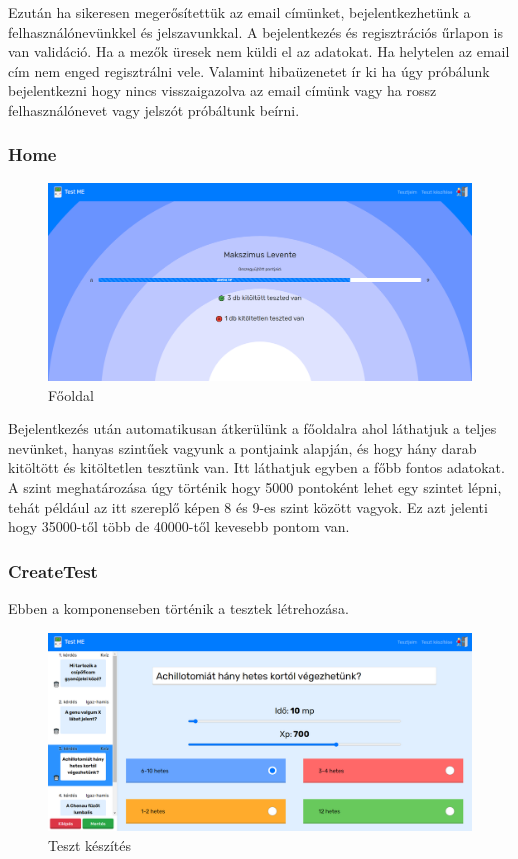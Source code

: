 Ezután ha sikeresen megerősítettük az email címünket, bejelentkezhetünk a felhasználónevünkkel és jelszavunkkal.
A bejelentkezés és regisztrációs űrlapon is van validáció. Ha a mezők üresek nem küldi el az adatokat. Ha helytelen az email cím nem enged regisztrálni vele. Valamint hibaüzenetet ír ki ha úgy próbálunk bejelentkezni hogy nincs visszaigazolva az email címünk vagy ha rossz felhasználónevet vagy jelszót próbáltunk beírni.

\subsubsection{Home}

\begin{figure}[H]
    \centering
    \includegraphics[width=\linewidth]{images/home.png}
    \caption{Főoldal}
\end{figure}

Bejelentkezés után automatikusan átkerülünk a főoldalra ahol láthatjuk a teljes nevünket, hanyas szintűek vagyunk a pontjaink alapján, és hogy hány darab kitöltött és kitöltetlen tesztünk van. Itt láthatjuk egyben a főbb fontos adatokat. A szint meghatározása úgy történik hogy 5000 pontoként lehet egy szintet lépni, tehát például az itt szereplő képen 8 és 9-es szint között vagyok. Ez azt jelenti hogy 35000-től több de 40000-től kevesebb pontom van.

\subsubsection{CreateTest}

Ebben a komponenseben történik a tesztek létrehozása.

\begin{figure}[H]
    \centering
    \includegraphics[width=\linewidth]{images/make_test1.png}
    \caption{Teszt készítés}
\end{figure}

